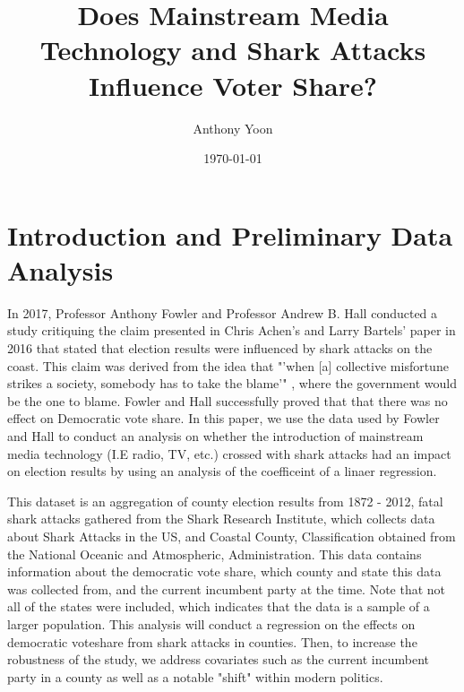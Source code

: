\documentclass[12pt]{article}
\begin{document}
\title{Does Mainstream Media Technology and Shark Attacks Influence Voter Share?}
\author{Anthony Yoon}
\date{\today}
\maketitle
\tableofcontents
\newpage 
\section{Introduction and Preliminary Data Analysis}
In 2017, Professor Anthony Fowler and Professor Andrew B. Hall conducted a study critiquing the claim presented in Chris Achen's and Larry Bartels' paper in 2016 that stated that election results were influenced by shark attacks on the coast. This claim was derived from the idea that "'when [a] collective misfortune strikes a society, somebody has to take the blame'" \cite{article1}, where the government would be the one to blame. Fowler and Hall successfully proved that that there was no effect on Democratic vote share. In this paper, we use the data used by Fowler and Hall to conduct an analysis on whether the introduction of mainstream media technology (I.E radio, TV, etc.) crossed with shark attacks had an impact on election results by using an analysis of the coefficeint of a linaer regression. 


This dataset is an aggregation of county election results from 1872 - 2012, fatal shark attacks gathered from the Shark Research Institute, which collects data about Shark Attacks in the US, and Coastal County, Classification obtained from the National Oceanic and Atmospheric, Administration. This data contains information about the democratic vote share, which county and state this data was collected from, and the current incumbent party at the time. Note that not all of the states were included, which indicates that the data is a sample of a larger population. 
This analysis will conduct a regression on the effects on democratic voteshare from shark attacks in counties. Then, to increase the robustness of the study, we address covariates such as the current incumbent party in a county as well as a notable "shift" within modern politics. 
\end{document}
